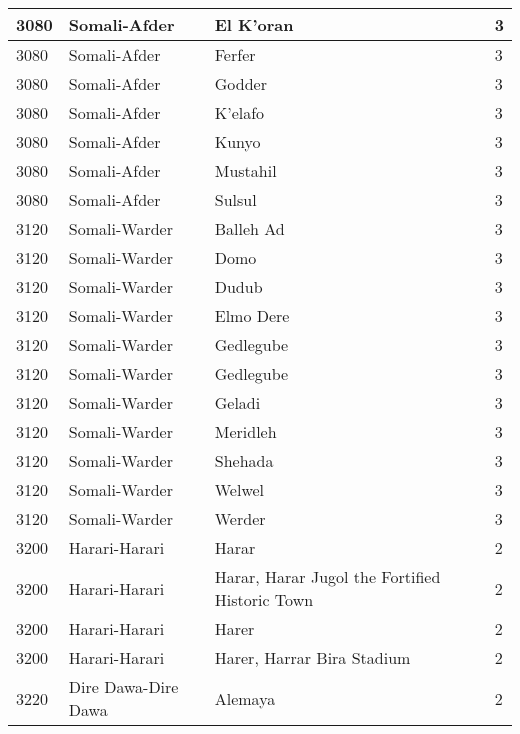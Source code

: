 \documentclass[12pt,a4paper,openbib,titlepage]{report}
\begin{document}
\begin{longtable}{|p{2cm}|p{6.5cm}|p{8cm}|p{1.5cm}|}
\hline 
\rule[-1ex]{0pt}{2.5ex} 3080 & Somali-Afder & El K'oran & 3 \\ 
\hline 
\rule[-1ex]{0pt}{2.5ex} 3080 & Somali-Afder & Ferfer & 3 \\ 
\hline 
\rule[-1ex]{0pt}{2.5ex} 3080 & Somali-Afder & Godder & 3 \\ 
\hline 
\rule[-1ex]{0pt}{2.5ex} 3080 & Somali-Afder & K'elafo & 3 \\ 
\hline 
\rule[-1ex]{0pt}{2.5ex} 3080 & Somali-Afder & Kunyo & 3 \\ 
\hline 
\rule[-1ex]{0pt}{2.5ex} 3080 & Somali-Afder & Mustahil & 3 \\ 
\hline 
\rule[-1ex]{0pt}{2.5ex} 3080 & Somali-Afder & Sulsul & 3 \\ 
\hline 
\rule[-1ex]{0pt}{2.5ex} 3120 & Somali-Warder & Balleh Ad & 3 \\
\hline 
\rule[-1ex]{0pt}{2.5ex} 3120 & Somali-Warder & Domo & 3 \\
\hline 
\rule[-1ex]{0pt}{2.5ex} 3120 & Somali-Warder & Dudub & 3 \\
\hline 
\rule[-1ex]{0pt}{2.5ex} 3120 & Somali-Warder & Elmo Dere & 3 \\
\hline 
\rule[-1ex]{0pt}{2.5ex} 3120 & Somali-Warder & Gedlegube & 3 \\
\hline 
\rule[-1ex]{0pt}{2.5ex} 3120 & Somali-Warder & Gedlegube & 3 \\
\hline 
\rule[-1ex]{0pt}{2.5ex} 3120 & Somali-Warder & Geladi & 3 \\
\hline 
\rule[-1ex]{0pt}{2.5ex} 3120 & Somali-Warder & Meridleh & 3 \\
\hline 
\rule[-1ex]{0pt}{2.5ex} 3120 & Somali-Warder & Shehada & 3 \\
\hline 
\rule[-1ex]{0pt}{2.5ex} 3120 & Somali-Warder & Welwel & 3 \\
\hline 
\rule[-1ex]{0pt}{2.5ex} 3120 & Somali-Warder & Werder & 3 \\
\hline 
\rule[-1ex]{0pt}{2.5ex} 3200 & Harari-Harari & Harar & 2 \\ 
\hline 
\rule[-1ex]{0pt}{2.5ex} 3200 & Harari-Harari & Harar, Harar Jugol the Fortified Historic Town & 2 \\ 
\hline 
\rule[-1ex]{0pt}{2.5ex} 3200 & Harari-Harari & Harer & 2 \\  
\hline 
\rule[-1ex]{0pt}{2.5ex} 3200 & Harari-Harari & Harer, Harrar Bira Stadium & 2 \\ 
\hline 
\rule[-1ex]{0pt}{2.5ex} 3220 & Dire Dawa-Dire Dawa & Alemaya & 2 \\ 
\hline 

\end{longtable}
\end{document}
